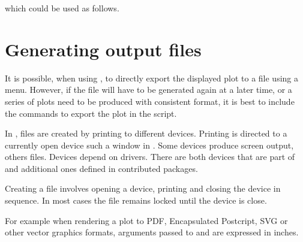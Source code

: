 \documentclass[krantz2]{krantz}\usepackage{knitr}
\begin{document}
which could be used as follows.

\begin{knitrout}\footnotesize
{}\color{fgcolor}\begin{kframe}
\begin{alltt}
\hlstd{(} 
          \hlstd{(}   
           \hlstd{=}  \hlopt{+}
          \hlstd{()}
\end{alltt}
\end{kframe}
\end{knitrout}


\section{Generating output files}\label{sec:plot:render}
It is possible, when using \RStudio, to directly export the displayed plot to a file using a menu. However, if the file will have to be generated again at a later time, or a series of plots need to be produced with consistent format, it is best to include the commands to export the plot in the script.

In \Rlang, files are created by printing to different devices. Printing is directed to a currently open device such a window in \RStudio. Some devices produce screen output, others files. Devices depend on drivers. There are both devices that are part of \Rlang and additional ones defined in contributed packages.

Creating a file involves opening a device, printing and closing the device in sequence. In most cases the file remains locked until the device is close.

For example when rendering a plot to PDF, Encapsulated Postcript, SVG or other vector graphics formats, arguments passed to  and  are expressed in inches.

\begin{knitrout}\footnotesize
{}\color{fgcolor}\begin{kframe}
\begin{alltt}
 \hlkwb{<-} \hlstd{(}\hlstd{(} \hlstd{=} \hlopt{-}\hlopt{:}\hlstd{),} \hlstd{(}  \hlopt{+}
  \hlstd{(} 
\hlstd{(} \hlstd{=} \hlstd{,}  \hlstd{=} \hlstd{,}  \hlstd{=} \hlstd{)}
\hlstd{()}
\end{alltt}
\end{kframe}
\end{knitrout}
\end{document}
